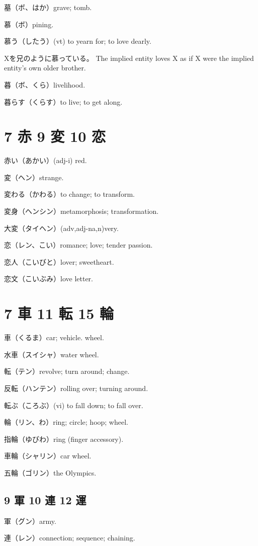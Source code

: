 墓（ボ、はか）grave; tomb.

慕（ボ）pining.

慕う（したう）(vt) to yearn for; to love dearly.

Xを兄のように慕っている。
The implied entity loves X as if
X were the implied entity's own older brother.

暮（ボ、くら）livelihood.

暮らす（くらす）to live; to get along.

\section{7 赤 9 変 10 恋}

赤い（あかい）(adj-i) red.

変（ヘン）strange.

変わる（かわる）to change; to transform.

変身（ヘンシン）metamorphosis; transformation.

大変（タイヘン）(adv,adj-na,n)very.

恋（レン、こい）romance; love; tender passion.

恋人（こいびと）lover; sweetheart.

恋文（こいぶみ）love letter.

\section{7 車 11 転 15 輪}

車（くるま）car; vehicle. wheel.

水車（スイシャ）water wheel.

転（テン）revolve; turn around; change.

反転（ハンテン）rolling over; turning around.

転ぶ（ころぶ）(vi) to fall down; to fall over.

輪（リン、わ）ring; circle; hoop; wheel.

指輪（ゆびわ）ring (finger accessory).

車輪（シャリン）car wheel.

五輪（ゴリン）the Olympics.

\subsection{9 軍 10 連 12 運}

軍（グン）army.

連（レン）connection; sequence; chaining.

